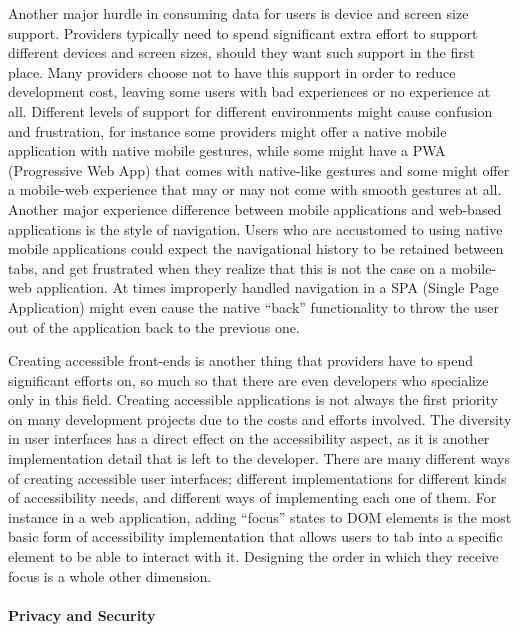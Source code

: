 Another major hurdle in consuming data for users is device and screen size support. Providers typically need to spend significant extra effort to support different devices and screen sizes, should they want such support in the first place. Many providers choose not to have this support in order to reduce development cost, leaving some users with bad experiences or no experience at all. Different levels of support for different environments might cause confusion and frustration, for instance some providers might offer a native mobile application with native mobile gestures, while some might have a PWA (Progressive Web App) that comes with native-like gestures and some might offer a mobile-web experience that may or may not come with smooth gestures at all. Another major experience difference between mobile applications and web-based applications is the style of navigation. Users who are accustomed to using native mobile applications could expect the navigational history to be retained between tabs, and get frustrated when they realize that this is not the case on a mobile-web application. At times improperly handled navigation in a SPA (Single Page Application) might even cause the native “back” functionality to throw the user out of the application back to the previous one.

Creating accessible front-ends is another thing that providers have to spend significant efforts on, so much so that there are even developers who specialize only in this field. Creating accessible applications is not always the first priority on many development projects due to the costs and efforts involved. The diversity in user interfaces has a direct effect on the accessibility aspect, as it is another implementation detail that is left to the developer. There are many different ways of creating accessible user interfaces; different implementations for different kinds of accessibility needs, and different ways of implementing each one of them. For instance in a web application, adding “focus” states to DOM elements is the most basic form of accessibility implementation that allows users to tab into a specific element to be able to interact with it. Designing the order in which they receive focus is a whole other dimension. 

\paragraph{Privacy and Security}

